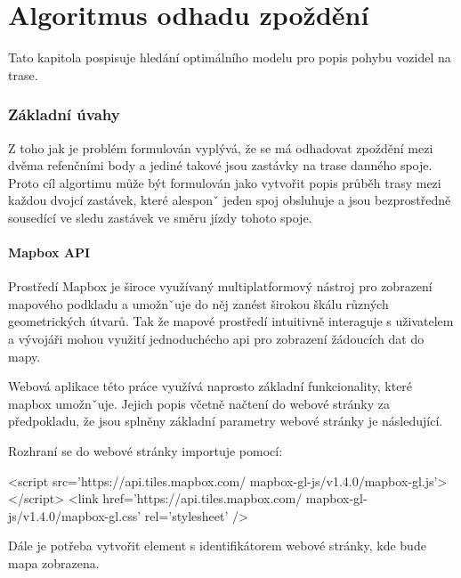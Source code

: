 
\chapter{Algoritmus odhadu zpoždění}

Tato kapitola pospisuje hledání optimálního modelu pro popis pohybu vozidel na trase.

\subsection{Základní úvahy}

Z toho jak je problém formulován vyplývá, že se má odhadovat zpoždění mezi dvěma refenčními body a jediné takové jsou zastávky na trase danného spoje. Proto cíl algortimu může být formulován jako vytvořit popis průběh trasy mezi každou dvojcí zastávek, které alesponˇ jeden spoj obsluhuje a jsou bezprostředně sousedící ve sledu zastávek ve směru jízdy tohoto spoje.

\bigbreak




\subsubsection{Mapbox API}

Prostředí Mapbox je široce využívaný multiplatformový nástroj pro zobrazení mapového podkladu a umožnˇuje do něj zanést širokou škálu různých geometrických útvarů. Tak že mapové prostředí intuitivně interaguje s uživatelem a vývojáři mohou využití jednoduchécho \gls{api} pro zobrazení žádoucích dat do mapy.

\bigbreak

Webová aplikace této práce využívá naprosto základní funkcionality, které mapbox umožnˇuje. Jejich popis včetně načtení do webové stránky za předpokladu, že jsou splněny základní parametry webové stránky je následující.

\bigbreak

Rozhraní se do webové stránky importuje pomocí:
\begin{code}[frame=none]
<script src='https://api.tiles.mapbox.com/
	mapbox-gl-js/v1.4.0/mapbox-gl.js'></script>
<link href='https://api.tiles.mapbox.com/
	mapbox-gl-js/v1.4.0/mapbox-gl.css' rel='stylesheet' />
\end{code}

\bigbreak

Dále je potřeba vytvořit element s identifikátorem webové stránky, kde bude mapa zobrazena.

